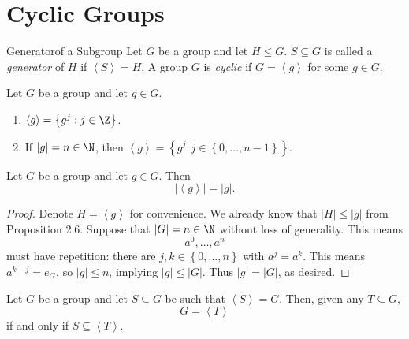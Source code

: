 \documentclass[pmath347]{subfiles}
\begin{document}
    \section{Cyclic Groups}
    
    \begin{definition}{Generator}{of a Subgroup}
        Let $G$ be a group and let $H\leq G$. $S\subseteq G$ is called a \emph{generator} of $H$ if $\left< S \right> = H$. A group $G$ is \emph{cyclic} if $G=\left< g \right>$ for some $g\in G$.  
    \end{definition}

    \begin{prop}{}
        Let $G$ be a group and let $g\in G$.
        \begin{enumerate}
            \item $\left< g \right> = \left\lbrace g^j:j\in\Z \right\rbrace$. 
            \item If $\left| g \right| = n\in\N$, then $\left< g \right> = \left\lbrace g^j:j\in\left\lbrace 0,\ldots,n-1 \right\rbrace  \right\rbrace$. 
        \end{enumerate}
    \end{prop}

    \begin{prop}{}
        Let $G$ be a group and let $g\in G$. Then
        \begin{equation*}
            \left| \left< g \right> \right| = \left| g \right| .
        \end{equation*}
    \end{prop}

    \begin{proof}
        Denote $H = \left< g \right>$ for convenience. We already know that $\left| H \right| \leq \left| g \right|$ from Proposition 2.6. Suppose that $\left| G \right| = n\in\N$ without loss of generality. This means 
        \begin{equation*}
            a^0, \ldots, a^n
        \end{equation*}
        must have repetition: there are $j,k\in \left\lbrace 0,\ldots,n \right\rbrace$ with $a^j=a^k$. This means $a^{k-j} = e_G$, so $\left| g \right| \leq n$, implying $\left| g \right| \leq \left| G \right|$. Thus $\left| g \right| = \left| G \right|$, as desired.
    \end{proof}
    
    \begin{prop}{}
        Let $G$ be a group and let $S\subseteq G$ be such that $\left< S \right> = G$. Then, given any $T\subseteq G$,
        \begin{equation*}
            G = \left< T \right>  
        \end{equation*}
        if and only if $S\subseteq \left< T \right>$. 
    \end{prop}
\end{document}
